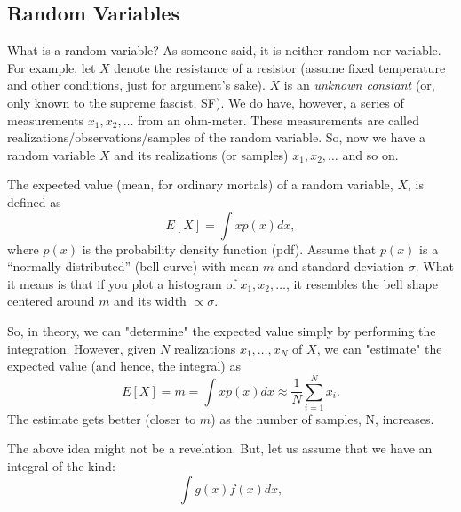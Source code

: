 \documentclass[11pt,onecolumn]{article}
\begin{document}
\subsection{Random Variables}
What is a random variable? As someone said, it is neither random nor variable. For example, let $X$ denote the resistance of a resistor (assume fixed temperature and other conditions, just for argument's sake). $X$ is an {\em unknown constant} (or, only known to the supreme fascist, SF). We do have, however, a series of measurements $x_1, x_2, \dots $ from an ohm-meter. These measurements are called realizations/observations/samples of the random variable. So, now we have a random variable $X$ and its realizations (or samples) $x_1, x_2, \dots $ and so on.

The expected value (mean, for ordinary mortals) of a random variable, $X$, is defined as
\[
E[X] = \int x p(x) dx,
\]
where $p(x)$ is the probability density function (pdf). Assume that $p(x)$ is a ``normally distributed'' (bell curve) with mean $m$ and standard deviation $\sigma$. What it means is that if you plot a histogram of  $x_1, x_2, \dots $, it resembles the bell shape centered around  $m$ and its width $\propto \sigma$.

So, in theory, we can "determine" the expected value simply by performing the integration. However, given $N$ realizations $x_1,\dots,x_N$ of $X$, we can "estimate" 
the expected value (and hence, the integral) as
\[
E[X] = m =  \int x p(x) dx \approx \frac{1}{N} \sum_{i=1}^N x_i.
\] 
The estimate gets better (closer to $m$) as the number of samples, N, increases.

The above idea might not be a revelation. But, let us assume that we have an integral of the kind:
\[
\int  g(x) f(x) dx ,
\]

% 
% 
% 
% 
\end{document}
